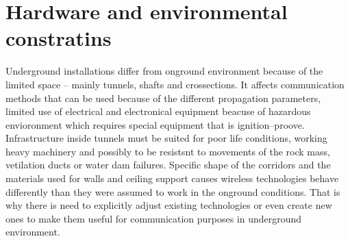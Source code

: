\documentclass[../main.tex]{subfiles}
\begin{document}
\section{Hardware and environmental constratins} %
\label{sub:hardware_and_environmental_constratins}


Underground installations differ from onground environment because of the limited space -- mainly tunnels, shafts and crossections. It affects communication methods that can be used because of the different propagation parameters, limited use of electrical and electronical equipment beacuse of hazardous envioronment which requires special equipment that is ignition--proove. Infrastructure inside tunnels must be suited for poor life conditions, working heavy machinery and possibly to be resistsnt to movements of the rock mass, vetilation ducts or water dam failures. Specific shape of the corridors and the materials used for walls and ceiling support causes wireless technologies behave differently than they were assumed to work in the onground conditions. That is why there is need to explicitly adjust existing technologies or even create new ones to make them useful for communication purposes in underground environment.
\end{document}

